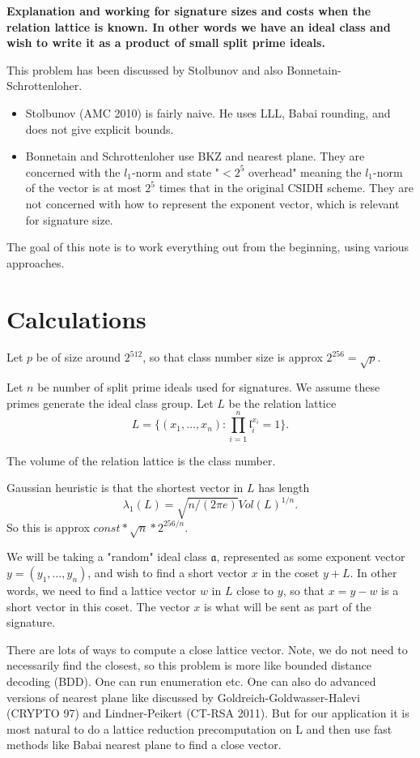 \documentclass{llncs}
\renewcommand{\a}{\mathfrak{a}}
\renewcommand{\l}{\mathfrak{l}}
\begin{document}
\textbf{Explanation and working for signature sizes and costs when the relation lattice is known. In other words we have an ideal class and wish to write it as a product of small split prime ideals.}

\vskip 0.2cm

This problem has been discussed by Stolbunov and also Bonnetain-Schrottenloher.
\begin{itemize}
\item Stolbunov (AMC 2010) is fairly naive. He uses LLL, Babai rounding, and does not give explicit bounds.

\item Bonnetain and Schrottenloher use BKZ and nearest plane. They are concerned with the $l_1$-norm and state "$< 2^5$ overhead" meaning the $l_1$-norm of the vector is at most $2^5$ times that in the original CSIDH scheme. They are not concerned with how to represent the exponent vector, which is relevant for signature size.
\end{itemize}

The goal of this note is to work everything out from the beginning, using various approaches.

\section{Calculations}

Let $p$ be of size around $2^{512} $, so that class number size is approx $2^{256} = \sqrt{p}$.

Let $n$ be number of split prime ideals used for signatures. We assume these primes generate the ideal class group. Let $L$ be the relation lattice 
\[
   L = \{ (x_1,\dots,x_n) : \prod_{i=1}^n \l_i^{x_i} = 1 \}.
\]

The volume of the relation lattice is the class number.

Gaussian heuristic is that the shortest vector in $L$ has length 
\[   \lambda_1(L)  =  \sqrt{n/(2 \pi e )} Vol(L)^{1/n}.   \]
So this is approx $const*\sqrt{n}*2^{256/n}$.

We will be taking a "random" ideal class $\a$, represented as some exponent vector $y = (y_1,\dots,y_n)$, and wish to find a short vector $x$ in the coset $y + L$. In other words, we need to find a lattice vector $w$ in $L$ close to $y$, so that $x=y-w$ is a short vector in this coset.
The vector $x$ is what will be sent as part of the signature.

There are lots of ways to compute a close lattice vector. Note, we do not need to necessarily find the closest, so this problem is more like bounded distance decoding (BDD). One can run enumeration etc. One can also do advanced versions of nearest plane like discussed by Goldreich-Goldwasser-Halevi (CRYPTO 97) and Lindner-Peikert (CT-RSA 2011).
But for our application it is most natural to do a lattice reduction precomputation on L and then use fast methods like Babai nearest plane to find a close vector.
\end{document}
